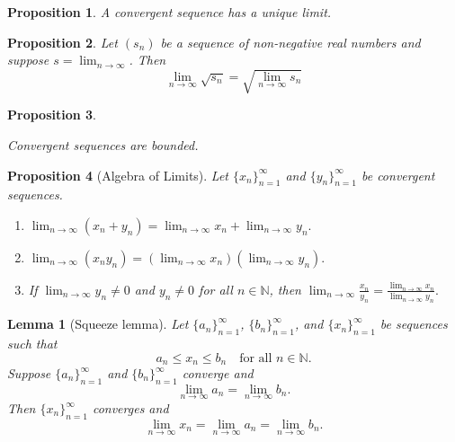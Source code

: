 \documentclass{article}
\newtheorem{lemma}{Lemma}[section]
\newtheorem{proposition}{Proposition}[section]
\theoremstyle{definition}
\theoremstyle{remark}
\begin{document}
\begin{proposition} \label{prp:uniqueness_of_limit}
A convergent sequence has a unique limit.
\end{proposition}






\begin{proposition}

Let \( (s_n)\) be a sequence of non-negative real numbers and suppose \( s = \lim_{n \to \infty}\). Then
\[
\lim_{n \to \infty}{\sqrt{s_n}} = \sqrt{\lim_{n \to \infty}{s_n}}
\]

\end{proposition}





\begin{proposition}\label{prp: convergent sequences are bounded}

Convergent sequences are bounded.

\end{proposition}






\begin{proposition}[Algebra of Limits] \label{prop:limit_algebra}
Let \( \{x_n\}_{n=1}^{\infty} \) and \( \{y_n\}_{n=1}^{\infty} \) be convergent sequences.
\begin{enumerate}
\item 
\(
\lim_{n\to\infty} (x_n + y_n) = \lim_{n\to\infty} x_n + \lim_{n\to\infty} y_n.
\)
\item 
\(
\lim_{n\to\infty} (x_n y_n) = \left( \lim_{n\to\infty} x_n \right) \left( \lim_{n\to\infty} y_n \right).
\)
\item If \( \lim_{n\to\infty} y_n \neq 0 \) and \( y_n \neq 0 \) for all \( n \in \mathbb{N} \), then
\(
\lim_{n\to\infty} \frac{x_n}{y_n} = \frac{\lim_{n\to\infty} x_n}{\lim_{n\to\infty} y_n}.
\)
\end{enumerate}
\end{proposition}



\begin{lemma}[Squeeze lemma] \label{lem:squeeze}
Let \( \{a_n\}_{n=1}^{\infty} \), \( \{b_n\}_{n=1}^{\infty} \), and \( \{x_n\}_{n=1}^{\infty} \) be sequences such that
\[
a_n \leq x_n \leq b_n \quad \text{for all } n \in \mathbb{N}.
\]
Suppose \( \{a_n\}_{n=1}^{\infty} \) and \( \{b_n\}_{n=1}^{\infty} \) converge and
\[
\lim_{n\to\infty} a_n = \lim_{n\to\infty} b_n.
\]
Then \( \{x_n\}_{n=1}^{\infty} \) converges and
\[
\lim_{n\to\infty} x_n = \lim_{n\to\infty} a_n = \lim_{n\to\infty} b_n.
\]
\end{lemma}
\end{document}

